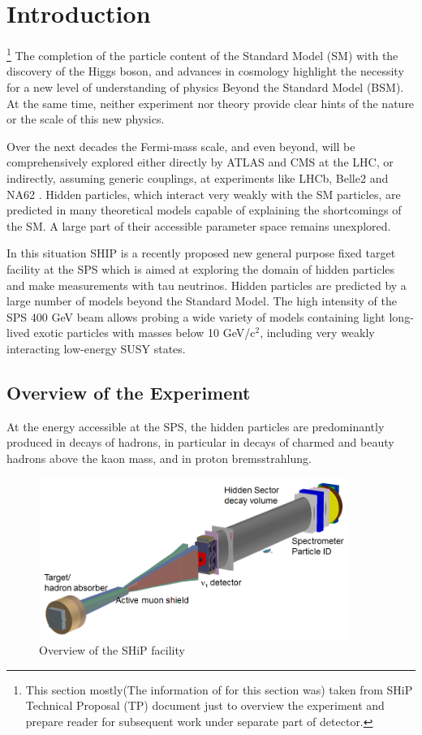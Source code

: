 
\section{Introduction}

	\footnote{This section mostly(The information of for this section was) taken from SHiP Technical Proposal (TP) document \cite{ship_TP} just to overview the experiment and prepare reader for subsequent work under separate part of detector.}
	The completion of the particle content of the Standard Model (SM) with the discovery of the Higgs boson, and advances in cosmology highlight the necessity for a new level of understanding of physics Beyond the Standard Model (BSM). At the same time, neither experiment nor theory provide clear hints of the nature or the scale of this new physics.

	Over the next decades the Fermi-mass scale, and even beyond, will be comprehensively  explored either directly by ATLAS and CMS at the LHC, or indirectly, assuming generic couplings, at experiments like LHCb, Belle2 and NA62 \cite{NA62_TDR}. Hidden particles, which interact very weakly with the SM particles, are predicted in many theoretical models capable of explaining the shortcomings of the SM. A large part of their accessible parameter space remains unexplored. 

	In this situation SHIP is a recently proposed new general purpose fixed target facility at the SPS which is aimed at exploring the domain of hidden particles and make measurements with tau neutrinos. Hidden particles are predicted by a large number of models beyond the Standard Model. The high intensity of the SPS 400 GeV beam allows probing a wide variety of models containing light long-lived exotic particles with masses below 10 GeV/c$^2$, including very weakly interacting low-energy SUSY states.
	
		
	\subsection{Overview of the Experiment}
	At the energy accessible at the SPS, the hidden particles are predominantly produced in decays of hadrons, in particular in decays of charmed and beauty hadrons above the kaon mass, and in proton bremsstrahlung.

	\begin{figure}[!h]
	\centering
	\includegraphics[width=0.9\textwidth]{introduction/SHiP-facility-overview}
	\caption{Overview of the SHiP facility \cite{ship_TP} }
	\label{fig:detector-overwiew}
	\end{figure}
	
